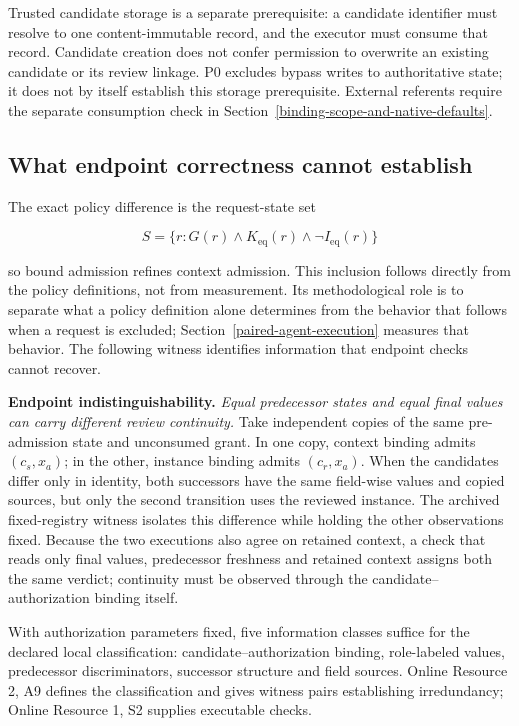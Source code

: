 \documentclass[pdflatex,sn-basic]{sn-jnl}
\begin{document}
Trusted candidate storage is a separate prerequisite: a candidate identifier must resolve to one content-immutable record, and the executor must consume that record. Candidate creation does not confer permission to overwrite an existing candidate or its review linkage. P0 excludes bypass writes to authoritative state; it does not by itself establish this storage prerequisite. External referents require the separate consumption check in Section~\ref{binding-scope-and-native-defaults}.

\subsection{What endpoint correctness cannot establish}\label{what-endpoint-correctness-cannot-establish}

The exact policy difference is the request-state set

\[
S = \{r : G(r) \land  K_{\mathrm{eq}}(r) \land  \neg I_{\mathrm{eq}}(r)\}
\]

so bound admission refines context admission. This inclusion follows directly from the policy definitions, not from measurement. Its methodological role is to separate what a policy definition alone determines from the behavior that follows when a request is excluded; Section~\ref{paired-agent-execution} measures that behavior. The following witness identifies information that endpoint checks cannot recover.

\textbf{Endpoint indistinguishability.} \emph{Equal predecessor states and equal final values can carry different review continuity.} Take independent copies of the same pre-admission state and unconsumed grant. In one copy, context binding admits \((c_s,x_a)\); in the other, instance binding admits \((c_r,x_a)\). When the candidates differ only in identity, both successors have the same field-wise values and copied sources, but only the second transition uses the reviewed instance. The archived fixed-registry witness isolates this difference while holding the other observations fixed. Because the two executions also agree on retained context, a check that reads only final values, predecessor freshness and retained context assigns both the same verdict; continuity must be observed through the candidate--authorization binding itself.

With authorization parameters fixed, five information classes suffice for the declared local classification: candidate--authorization binding, role-labeled values, predecessor discriminators, successor structure and field sources. Online Resource 2, A9 defines the classification and gives witness pairs establishing irredundancy; Online Resource 1, S2 supplies executable checks.
\end{document}
